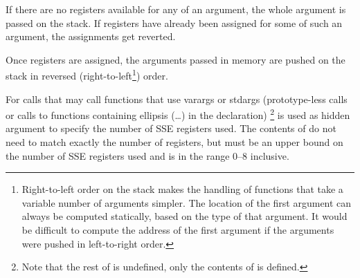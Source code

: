 If there are no registers available for any \eightbyte of an
argument, the whole argument is passed on the stack. If registers have
already been assigned for some \eightbytes of such an argument, the
assignments get reverted.

Once registers are assigned, the arguments passed in memory are pushed
on the stack in reversed (right-to-left\footnote{Right-to-left order
  on the stack makes the handling of functions that take a variable
  number of arguments simpler.  The location of the first argument can
  always be computed statically, based on the type of that argument.
  It would be difficult to compute the address of the first argument
  if the arguments were pushed in left-to-right order.}) order.

For calls that may call functions that use varargs or stdargs
(prototype-less calls or calls to functions containing ellipsis
(\dots) in the declaration) %
\footnote{Note that the rest of \RAX is undefined, only the contents
  of  is defined.}
 is used as hidden argument to specify
the number of SSE registers used. The contents of  do not need to
match exactly the number of registers, but must be an upper bound on
the number of SSE registers used and is in the range 0--8 inclusive.


